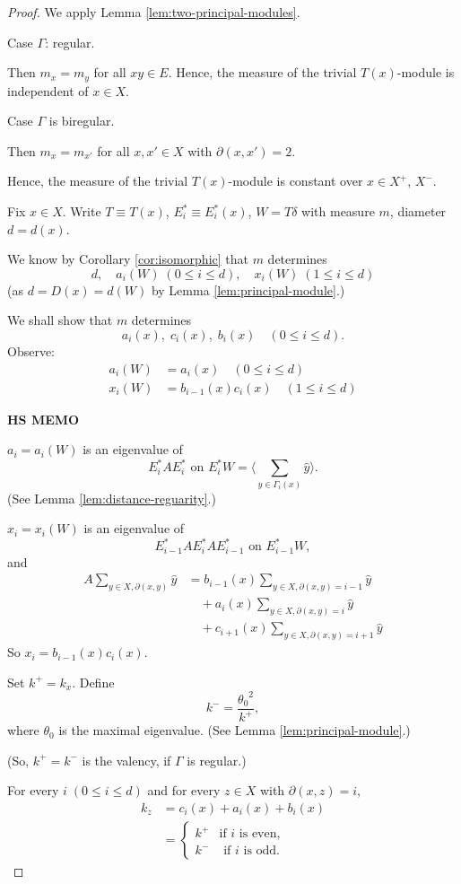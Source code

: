 \documentclass[
]{book}
\theoremstyle{definition}
\theoremstyle{definition}
\theoremstyle{definition}
\theoremstyle{definition}
\theoremstyle{remark}
\begin{document}
\begin{proof}
We apply Lemma \ref{lem:two-principal-modules}.

Case \(\Gamma\): regular.

Then \(m_x = m_y\) for all \(xy\in E\). Hence, the measure of the trivial \(T(x)\)-module is independent of \(x\in X\).

Case \(\Gamma\) is biregular.

Then \(m_x = m_{x'}\) for all \(x, x'\in X\) with \(\partial(x,x') = 2\).

Hence, the measure of the trivial \(T(x)\)-module is constant over \(x\in X^+\), \(X^-\).

Fix \(x\in X\). Write \(T\equiv T(x)\), \(E^*_i \equiv E^*_i(x)\), \(W = T\delta\) with measure \(m\), diameter \(d = d(x)\).

We know by Corollary \ref{cor:isomorphic} that \(m\) determines
\[d, \quad a_i(W) \; (0\leq i\leq d), \quad x_i(W) \; (1\leq i\leq d)\]
(as \(d = D(x) = d(W)\) by Lemma \ref{lem:principal-module}.)

We shall show that \(m\) determines
\[a_i(x), \;  c_i(x), \; b_i(x) \quad (0\leq i\leq d).\]
Observe:
\begin{align}
a_i(W) & = a_i(x) \quad (0\leq i\leq d)\\
x_i(W) & = b_{i-1}(x)c_i(x) \quad (1\leq i\leq d)
\end{align}

\textbf{HS MEMO}

\(a_i = a_i(W)\) is an eigenvalue of
\[E^*_iAE^*_i \text{ on } E^*_iW = \langle \sum_{y\in \Gamma_i(x)}\hat{y}\rangle. \]
(See Lemma \ref{lem:distance-reguarity}.)

\(x_i = x_i(W)\) is an eigenvalue of
\[E^*_{i-1}AE^*_iAE^*_{i-1} \text{ on } E^*_{i-1}W,\]
and
\begin{align}
A\sum_{y\in X,\partial(x,y)}\hat{y} & = b_{i-1}(x)\sum_{y\in X, \partial(x,y)=i-1}\hat{y} \\
& \quad + a_i(x)\sum_{y\in X, \partial(x,y)=i}\hat{y} \\
& \quad + c_{i+1}(x)\sum_{y\in X, \partial(x,y)=i+1}\hat{y}
\end{align}
So \(x_i = b_{i-1}(x)c_i(x)\).

Set \(k^+ = k_x\). Define
\[k^- = \frac{{\theta_0}^2}{k^+},\]
where \(\theta_0\) is the maximal eigenvalue. (See Lemma \ref{lem:principal-module}.)

(So, \(k^+ = k^-\) is the valency, if \(\Gamma\) is regular.)

For every \(i \; (0\leq i\leq d)\) and for every \(z\in X\) with \(\partial(x,z) = i\),
\begin{align}
k_z & = c_i(x) + a_i(x) + b_i(x)\\
& = \begin{cases} k^+ & \text{if $i$ is even,}\\
k^- & \text{ if $i$ is odd.}
\end{cases}
\end{align}


\end{proof}
\end{document}
